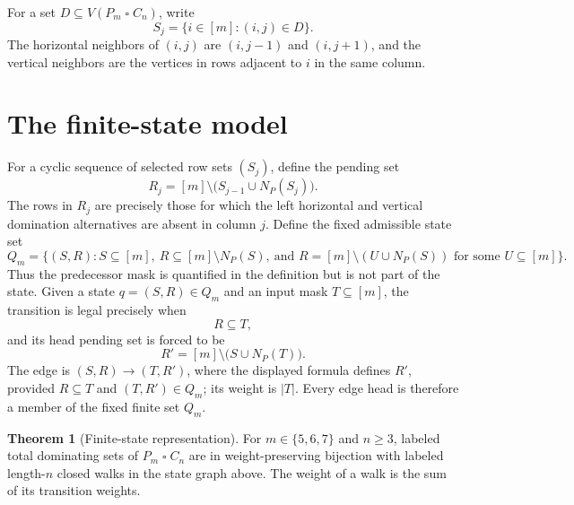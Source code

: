 \documentclass[11pt]{article}
\theoremstyle{definition}
\newtheorem{theorem}{Theorem}[section]
\newcommand{\sq}{\mathbin{\square}}
\begin{document}
For a set \(D\subseteq V(P_m\sq C_n)\), write
\[
S_j=\{i\in[m]:(i,j)\in D\}.
\]
The horizontal neighbors of \((i,j)\) are \((i,j-1)\) and \((i,j+1)\),
and the vertical neighbors are the vertices in rows adjacent to \(i\) in
the same column.

\section{The finite-state model}

For a cyclic sequence of selected row sets \((S_j)\), define the pending set
\[
R_j=[m]\setminus\bigl(S_{j-1}\cup N_P(S_j)\bigr).
\]
The rows in \(R_j\) are precisely those for which the left horizontal and
vertical domination alternatives are absent in column \(j\). Define the fixed
admissible state set
\[
Q_m=\{(S,R):S\subseteq[m],\ R\subseteq[m]\setminus N_P(S),\
\text{and }R=[m]\setminus(U\cup N_P(S))\text{ for some }U\subseteq[m]\}.
\]
Thus the predecessor mask is quantified in the definition but is not part of
the state. Given a state \(q=(S,R)\in Q_m\) and an input mask
\(T\subseteq[m]\), the transition is legal precisely when
\[
R\subseteq T,
\]
and its head pending set is forced to be
\[
R'=[m]\setminus\bigl(S\cup N_P(T)\bigr).
\]
The edge is \((S,R)\to(T,R')\), where the displayed formula defines \(R'\),
provided \(R\subseteq T\) and \((T,R')\in Q_m\); its weight is \(|T|\).
Every edge head is therefore a member of the fixed finite set \(Q_m\).

\begin{theorem}[Finite-state representation]\label{thm:bijection}
For \(m\in\{5,6,7\}\) and \(n\geq3\), labeled total dominating sets of
\(P_m\sq C_n\) are in weight-preserving bijection with labeled length-\(n\)
closed walks in the state graph above. The weight of a walk is the sum of its
transition weights.
\end{theorem}
\end{document}
